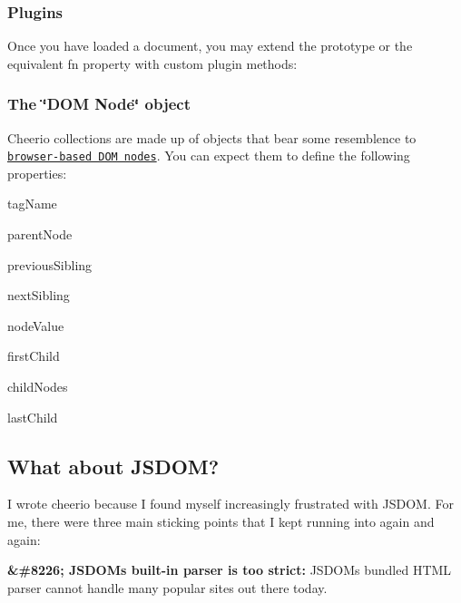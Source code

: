 \subsubsection*{Plugins}

Once you have loaded a document, you may extend the prototype or the equivalent {\ttfamily fn} property with custom plugin methods\+:




\subsubsection*{The \char`\"{}\+D\+O\+M Node\char`\"{} object}

Cheerio collections are made up of objects that bear some resemblence to \href{https://developer.mozilla.org/en-US/docs/Web/API/Node}{\tt browser-\/based D\+OM nodes}. You can expect them to define the following properties\+:


\begin{DoxyItemize}
\item {\ttfamily tag\+Name}
\item {\ttfamily parent\+Node}
\item {\ttfamily previous\+Sibling}
\item {\ttfamily next\+Sibling}
\item {\ttfamily node\+Value}
\item {\ttfamily first\+Child}
\item {\ttfamily child\+Nodes}
\item {\ttfamily last\+Child}
\end{DoxyItemize}

\subsection*{What about J\+S\+D\+OM?}

I wrote cheerio because I found myself increasingly frustrated with J\+S\+D\+OM. For me, there were three main sticking points that I kept running into again and again\+:

{\bfseries \&\#8226; J\+S\+D\+OM\textquotesingle{}s built-\/in parser is too strict\+:} J\+S\+D\+OM\textquotesingle{}s bundled H\+T\+ML parser cannot handle many popular sites out there today.

